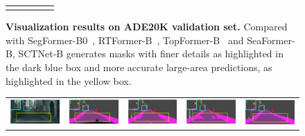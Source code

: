\documentclass[letterpaper]{article} %
\begin{document}
\begin{figure}[ht!]
{\begin{tabular}{ccccc}
 &  &  & &  \\
\end{tabular}

}

\caption{\textbf{Visualization results on ADE20K validation set.} Compared with SegFormer-B0~\cite{xie2021segformer}, RTFormer-B~\cite{wang2022rtformer}, TopFormer-B~\cite{zhang2022topformer} and SeaFormer-B\cite{wan2023seaformer}, SCTNet-B generates masks with finer details as highlighted in the dark blue box and more accurate large-area predictions, as highlighted in the yellow box.
    }
\label{suppfig:ADE_Visual}

\end{figure}

\begin{figure}[t]
\centering
\setlength{\fboxsep}{0pt}
\begin{tabular}{ccccc}
\includegraphics[width=0.19\linewidth]{image/supp/figure6/1a.png}\label{city_1a} &
\hspace{-12pt}
\includegraphics[width=0.19\linewidth]{image/supp/figure6/1b.png}\label{city_1b} &
\hspace{-12pt}
\includegraphics[width=0.19\linewidth]{image/supp/figure6/1c.png}\label{city_1c} &
\hspace{-12pt}
\includegraphics[width=0.19\linewidth]{image/supp/figure6/1d.png}\label{city_1d} &
\hspace{-12pt}
\includegraphics[width=0.19\linewidth]{image/supp/figure6/1e.png}\label{city_1e} \\


\end{tabular}
\end{figure}
\end{document}
